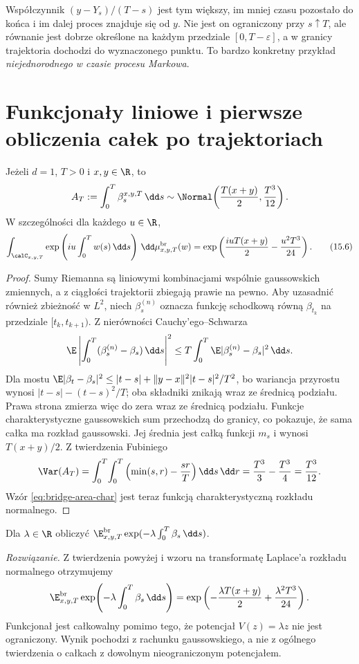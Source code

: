 \begin{uwaga}
Współczynnik $(y-Y_s)/(T-s)$ jest tym większy, im
mniej czasu pozostało do końca i im dalej proces
znajduje się od $y$. Nie jest on ograniczony przy
$s\uparrow T$, ale równanie jest dobrze określone
na każdym przedziale $[0,T-\varepsilon]$, a w granicy
trajektoria dochodzi do wyznaczonego punktu.
To bardzo konkretny przykład \emph{niejednorodnego
w czasie procesu Markowa}.
\end{uwaga}

\section{Funkcjonały liniowe i pierwsze obliczenia całek po trajektoriach}

\begin{twierdzenie}
\label{th:bridge-integrated}
Jeżeli $d=1$, $T>0$ i $x,y\in\R$, to
\[
 A_T:=\int_0^T\beta_s^{x,y,T}\,\dd s
 \sim\Normal\!\left(\frac{T(x+y)}2,\frac{T^3}{12}\right).
\]
W szczególności dla każdego $u\in\R$,
\[
 \int_{\calC_{x,y,T}}\exp\left(iu\int_0^Tw(s)\,\dd s\right)
     \,\dd\mu_{x,y,T}^{\mathrm{br}}(w)
 =\exp\left(\frac{iuT(x+y)}2-\frac{u^2T^3}{24}\right).
 \tag{15.6}\label{eq:bridge-area-char}
\]
\end{twierdzenie}
\begin{proof}
Sumy Riemanna są liniowymi kombinacjami wspólnie
gaussowskich zmiennych, a z ciągłości trajektorii zbiegają
prawie na pewno. Aby uzasadnić również zbieżność w $L^2$,
niech $\beta^{(n)}_s$ oznacza funkcję schodkową równą
$\beta_{t_k}$ na przedziale $[t_k,t_{k+1})$.
Z nierówności Cauchy'ego--Schwarza
\[
\E\left|\int_0^T(\beta^{(n)}_s-\beta_s)\,\dd s\right|^2
\le T\int_0^T\E|\beta^{(n)}_s-\beta_s|^2\,\dd s.
\]
Dla mostu
$\E|\beta_t-\beta_s|^2\le |t-s|+
\|y-x\|^2|t-s|^2/T^2$,
bo wariancja przyrostu wynosi
$|t-s|-(t-s)^2/T$; oba składniki znikają wraz
ze średnicą podziału. Prawa strona
zmierza więc do zera wraz ze średnicą podziału. Funkcje
charakterystyczne gaussowskich sum przechodzą do granicy,
co pokazuje, że sama całka ma rozkład gaussowski.
Jej średnia jest całką funkcji $m_s$ i wynosi
$T(x+y)/2$. Z twierdzenia Fubiniego
\[
 \Var(A_T)=\int_0^T\!\int_0^T
 \left(\min(s,r)-\frac{sr}{T}\right)\dd s\,\dd r
 =\frac{T^3}{3}-\frac{T^3}{4}=\frac{T^3}{12}.
\]
Wzór \eqref{eq:bridge-area-char} jest teraz funkcją
charakterystyczną rozkładu normalnego.
\end{proof}

\begin{zadanie}
Dla $\lambda\in\R$ obliczyć
$\E_{x,y,T}^{\mathrm{br}}
\exp(-\lambda\int_0^T\beta_s\,\dd s)$.

\emph{Rozwiązanie.} Z twierdzenia powyżej i wzoru na
transformatę Laplace'a rozkładu normalnego otrzymujemy
\[
 \E_{x,y,T}^{\mathrm{br}}
  \exp\!\left(-\lambda\int_0^T\beta_s\,\dd s\right)
 =\exp\left(-\frac{\lambda T(x+y)}2
           +\frac{\lambda^2T^3}{24}\right).
\]
Funkcjonał jest całkowalny pomimo tego, że potencjał
$V(z)=\lambda z$ nie jest ograniczony. Wynik pochodzi
z rachunku gaussowskiego, a nie z ogólnego twierdzenia
o całkach z dowolnym nieograniczonym potencjałem.
\end{zadanie}


